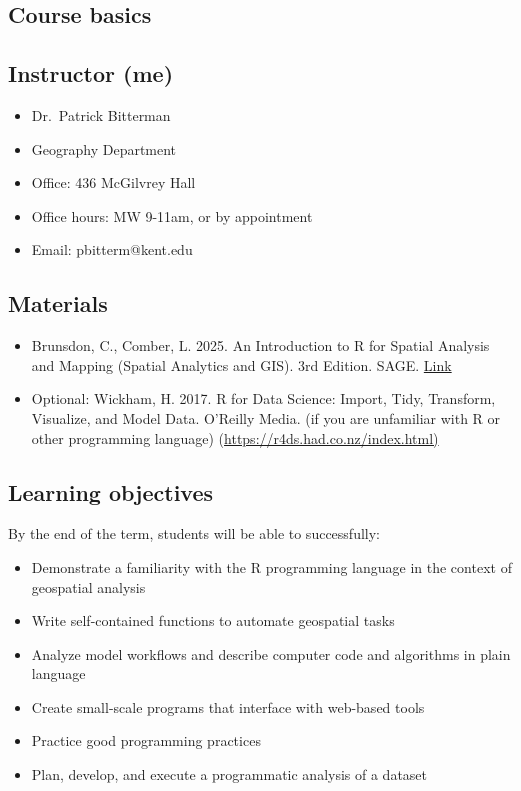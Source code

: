 \documentclass[
  letterpaper,
  DIV=11,
  numbers=noendperiod]{scrartcl}
\providecommand{\tightlist}{%
  \setlength{\itemsep}{0pt}\setlength{\parskip}{0pt}}
\begin{document}
\subsection{Course basics}\label{course-basics}

\subsection{Instructor (me)}\label{instructor-me}

\begin{itemize}
\item
  Dr.~Patrick Bitterman
\item
  Geography Department
\item
  Office: 436 McGilvrey Hall
\item
  Office hours: MW 9-11am, or by appointment
\item
  Email: pbitterm@kent.edu
\end{itemize}

\subsection{Materials}\label{materials}

\begin{itemize}
\item
  Brunsdon, C., Comber, L. 2025. An Introduction to R for Spatial
  Analysis and Mapping (Spatial Analytics and GIS). 3rd Edition. SAGE.
  \href{https://collegepublishing.sagepub.com/products/an-introduction-to-r-for-spatial-analysis-and-mapping-3-288946}{Link}
\item
  Optional: Wickham, H. 2017. R for Data Science: Import, Tidy,
  Transform, Visualize, and Model Data. O'Reilly Media. (if you are
  unfamiliar with R or other programming language)
  (\url{https://r4ds.had.co.nz/index.html)}
\end{itemize}

\subsection{Learning objectives}\label{learning-objectives}

By the end of the term, students will be able to successfully:

\begin{itemize}
\tightlist
\item
  Demonstrate a familiarity with the R programming language in the
  context of geospatial analysis
\item
  Write self-contained functions to automate geospatial tasks
\item
  Analyze model workflows and describe computer code and algorithms in
  plain language
\item
  Create small-scale programs that interface with web-based tools
\item
  Practice good programming practices
\item
  Plan, develop, and execute a programmatic analysis of a dataset
\end{itemize}
\end{document}
